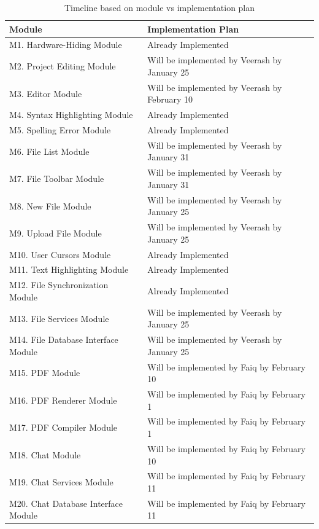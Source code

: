 \documentclass[12pt, titlepage]{article}
\begin{document}
	
	\footnotesize\begin{longtable}{p{} p{}}
		\caption{Timeline based on module vs implementation plan}\\
		\toprule
		\textbf{Module} & \textbf{Implementation Plan}\\
		\midrule
		M1. Hardware-Hiding Module &  Already Implemented  \\
		M2. Project Editing Module &  Will be implemented by Veerash by January 25  \\
		M3. Editor Module &  Will be implemented by Veerash by February 10  \\
		M4. Syntax Highlighting Module &  Already Implemented  \\
		M5. Spelling Error Module &  Already Implemented  \\
		M6. File List Module &  Will be implemented by Veerash by January 31  \\
		M7. File Toolbar Module &  Will be implemented by Veerash by January 31  \\
		M8. New File Module &  Will be implemented by Veerash by January 25  \\
		M9. Upload File Module &  Will be implemented by Veerash by January 25  \\
		M10. User Cursors Module &  Already Implemented  \\
		M11. Text Highlighting Module &  Already Implemented  \\
		M12. File Synchronization Module &  Already Implemented  \\
		M13. File Services Module &  Will be implemented by Veerash by January 25  \\
		M14. File Database Interface Module &  Will be implemented by Veerash by January 25  \\
		M15. PDF Module &  Will be implemented by Faiq by February 10  \\
		M16. PDF Renderer Module &  Will be implemented by Faiq by February 1  \\
		M17. PDF Compiler Module &  Will be implemented by Faiq by February 1  \\
		M18. Chat Module &  Will be implemented by Faiq by February 10  \\
		M19. Chat Services Module &  Will be implemented by Faiq by February 11  \\
		M20. Chat Database Interface Module &  Will be implemented by Faiq by February 11  \\

\end{longtable}
\end{document}
